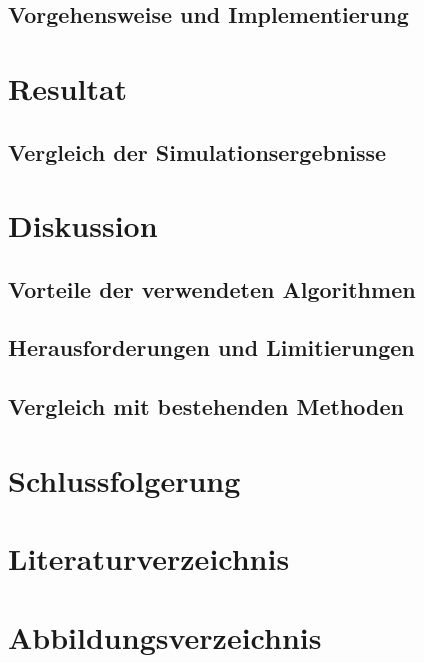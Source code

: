 \documentclass[a4paper,12pt,twoside]{article}
\begin{document}
\subsection{Vorgehensweise und Implementierung}

\section{Resultat}
\subsection{Vergleich der Simulationsergebnisse}

\section{Diskussion}
\subsection{Vorteile der verwendeten Algorithmen}
\subsection{Herausforderungen und Limitierungen}
\subsection{Vergleich mit bestehenden Methoden}

\section{Schlussfolgerung}
\section{Literaturverzeichnis}
\section{Abbildungsverzeichnis}
\end{document}
